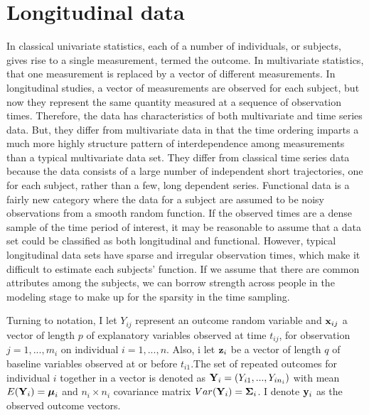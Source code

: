 \section{Longitudinal data}
In classical univariate statistics, each of a number of individuals, or subjects, gives rise to a single measurement, termed the outcome. In multivariate statistics, that one measurement is replaced by a vector of different measurements. In longitudinal studies, a vector of measurements are observed for each subject, but now they represent the same quantity measured at a sequence of observation times. Therefore, the data has characteristics of both multivariate and time series data. But, they differ from multivariate data in that the time ordering imparts a much more highly structure pattern of interdependence among measurements than a typical multivariate data set. They differ from classical time series data because the data consists of a large number of independent short trajectories, one for each subject, rather than a few, long dependent series. Functional data is a fairly new category \cite{ramsay2006} where the data for a subject are assumed to be noisy observations from a smooth random function. If the observed times are a dense sample of the time period of interest, it may be reasonable to assume that a data set could be classified as both longitudinal and functional. However, typical longitudinal data sets have sparse and irregular observation times, which make it difficult to estimate each subjects' function. If we assume that there are common attributes among the subjects, we can borrow strength across people in the modeling stage to make up for the sparsity in the time sampling. 

Turning to notation, I let $Y_{ij}$ represent an outcome random variable and $\mathbf x_{ij}$ a vector of length $p$ of explanatory variables observed at time $t_{ij}$, for observation $j=1,...,m_{i}$ on individual $i=1,...,n$. Also, i let $\mathbf z_{i}$ be a vector of length $q$ of baseline variables observed at or before $t_{i1}$.The set of repeated outcomes for individual $i$ together in a vector is denoted as $\mathbf Y_{i} = (Y_{i1},...,Y_{in_{i}})$ with mean $E(\mathbf Y_{i}) = \boldsymbol\mu_{i}$ and $n_{i}\times n_{i}$ covariance matrix $Var(\mathbf Y_{i}) = \mathbf\Sigma_{i}$. I denote $\mathbf y_{i}$ as the observed outcome vectors. 

